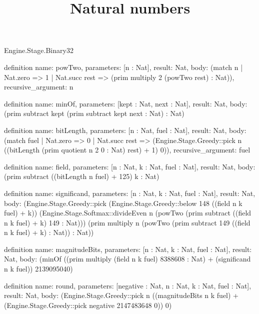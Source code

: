 \begin{lexlean}{Engine.Stage.Binary32}
\title{Natural numbers}
\begin{semanticmodule}
definition{
  name: powTwo,
  parameters: [n : Nat],
  result: Nat,
  body: (match n | Nat.zero => 1 | Nat.succ rest => (prim multiply 2 (powTwo rest) : Nat)),
  recursive_argument: n
}

definition{
  name: minOf,
  parameters: [kept : Nat, next : Nat],
  result: Nat,
  body: (prim subtract kept (prim subtract kept next : Nat) : Nat)
}

definition{
  name: bitLength,
  parameters: [n : Nat, fuel : Nat],
  result: Nat,
  body: (match fuel
    | Nat.zero => 0
    | Nat.succ rest => (Engine.Stage.Greedy::pick n ((bitLength (prim quotient n 2 0 : Nat) rest) + 1) 0)),
  recursive_argument: fuel
}

definition{
  name: field,
  parameters: [n : Nat, k : Nat, fuel : Nat],
  result: Nat,
  body: (prim subtract ((bitLength n fuel) + 125) k : Nat)
}

definition{
  name: significand,
  parameters: [n : Nat, k : Nat, fuel : Nat],
  result: Nat,
  body: (Engine.Stage.Greedy::pick (Engine.Stage.Greedy::below 148 ((field n k fuel) + k)) (Engine.Stage.Softmax::divideEven n (powTwo (prim subtract ((field n k fuel) + k) 149 : Nat))) (prim multiply n (powTwo (prim subtract 149 ((field n k fuel) + k) : Nat)) : Nat))
}

definition{
  name: magnitudeBits,
  parameters: [n : Nat, k : Nat, fuel : Nat],
  result: Nat,
  body: (minOf ((prim multiply (field n k fuel) 8388608 : Nat) + (significand n k fuel)) 2139095040)
}

definition{
  name: round,
  parameters: [negative : Nat, n : Nat, k : Nat, fuel : Nat],
  result: Nat,
  body: (Engine.Stage.Greedy::pick n ((magnitudeBits n k fuel) + (Engine.Stage.Greedy::pick negative 2147483648 0)) 0)
}
\end{semanticmodule}
\end{lexlean}
